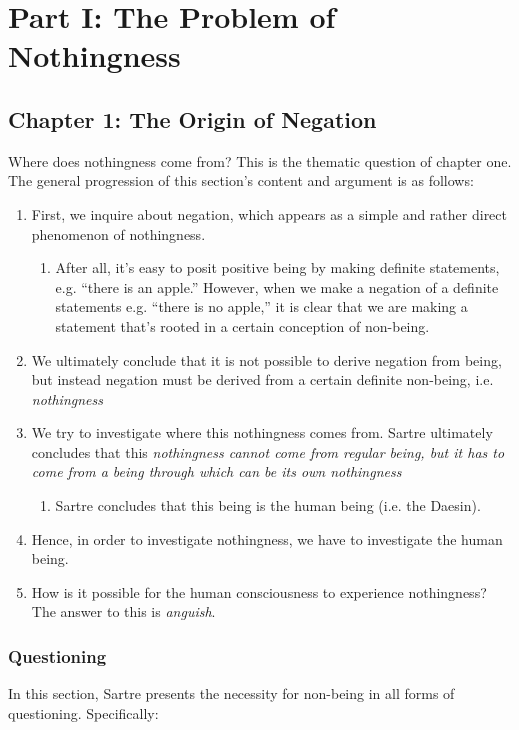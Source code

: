 \chapter{Part I: The Problem of Nothingness}

\section{Chapter 1: The Origin of Negation}
Where does nothingness come from? This is the thematic question of chapter one. The general progression of this section's content and argument is as follows:

\begin{enumerate}
  \item First, we inquire about negation, which appears as a simple and rather direct phenomenon of nothingness.
  \begin{enumerate}
    \item After all, it's easy to posit positive being by making definite statements, e.g. \enquote{there is an apple.} However, when we make a negation of a definite statements e.g. \enquote{there is no apple,} it is clear that we are making a statement that's rooted in a certain conception of non-being.
  \end{enumerate}
  \item We ultimately conclude that it is not possible to derive negation from being, but instead negation must be derived from a certain definite non-being, i.e. \emph{nothingness}
  \item We try to investigate where this nothingness comes from. Sartre ultimately concludes that this \emph{nothingness cannot come from regular being, but it has to come from a being through which can be its own nothingness}
  \begin{enumerate}
    \item Sartre concludes that this being is the human being (i.e. the Daesin).
  \end{enumerate}
  \item Hence, in order to investigate nothingness, we have to investigate the human being.
  \item How is it possible for the human consciousness to experience nothingness? The answer to this is \emph{anguish}.
\end{enumerate}

\subsection{Questioning}
In this section, Sartre presents the necessity for non-being in all forms of questioning. Specifically:

